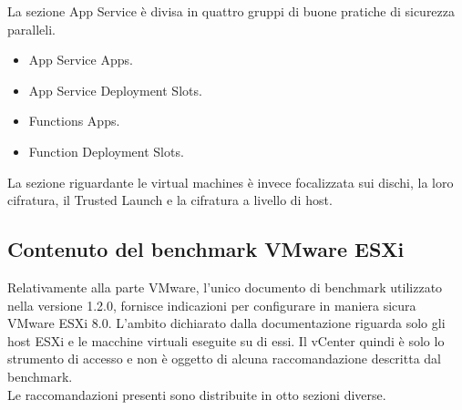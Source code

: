 \documentclass[a4paper,11pt]{report}
\begin{document}
La sezione App Service è divisa in quattro gruppi di buone pratiche di sicurezza paralleli.
\begin{itemize}
\item App Service Apps.
\item App Service Deployment Slots.
\item Functions Apps.
\item Function Deployment Slots.
\end{itemize}

La sezione riguardante le virtual machines è invece focalizzata sui dischi, la loro cifratura, il Trusted Launch e la cifratura a livello di host.



\subsection{Contenuto del benchmark VMware ESXi}

Relativamente alla parte VMware, l'unico documento di benchmark utilizzato nella versione 1.2.0, fornisce indicazioni per configurare in maniera sicura VMware ESXi 8.0. L'ambito dichiarato dalla documentazione riguarda solo gli host ESXi e le macchine virtuali eseguite su di essi. Il vCenter quindi è solo lo strumento di accesso e non è oggetto di alcuna raccomandazione descritta dal benchmark.\\
Le raccomandazioni presenti sono distribuite in otto sezioni diverse.
\end{document}
